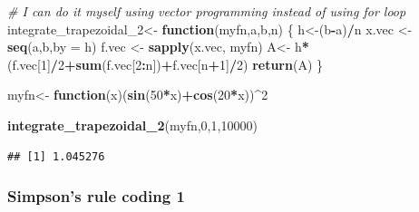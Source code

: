 \documentclass[
]{article}
\newenvironment{Shaded}{\begin{snugshade}}{\end{snugshade}}
\newcommand{\AttributeTok}[1]{\textcolor[rgb]{0.13,0.29,0.53}{#1}}
\newcommand{\CommentTok}[1]{\textcolor[rgb]{0.56,0.35,0.01}{\textit{#1}}}
\newcommand{\ControlFlowTok}[1]{\textcolor[rgb]{0.13,0.29,0.53}{\textbf{#1}}}
\newcommand{\DecValTok}[1]{\textcolor[rgb]{0.00,0.00,0.81}{#1}}
\newcommand{\FunctionTok}[1]{\textcolor[rgb]{0.13,0.29,0.53}{\textbf{#1}}}
\newcommand{\NormalTok}[1]{#1}
\newcommand{\OtherTok}[1]{\textcolor[rgb]{0.56,0.35,0.01}{#1}}
\newcommand{\SpecialCharTok}[1]{\textcolor[rgb]{0.81,0.36,0.00}{\textbf{#1}}}
\begin{document}
\begin{Shaded}
\begin{Highlighting}[]
\CommentTok{\# I can do it myself using vector programming instead of using for loop}
\NormalTok{integrate\_trapezoidal\_2}\OtherTok{\textless{}{-}} \ControlFlowTok{function}\NormalTok{(myfn,a,b,n) \{}
\NormalTok{  h}\OtherTok{\textless{}{-}}\NormalTok{(b}\SpecialCharTok{{-}}\NormalTok{a)}\SpecialCharTok{/}\NormalTok{n}
\NormalTok{  x.vec }\OtherTok{\textless{}{-}} \FunctionTok{seq}\NormalTok{(a,b,}\AttributeTok{by =}\NormalTok{ h)}
\NormalTok{  f.vec }\OtherTok{\textless{}{-}} \FunctionTok{sapply}\NormalTok{(x.vec, myfn) }
\NormalTok{  A}\OtherTok{\textless{}{-}}\NormalTok{ h}\SpecialCharTok{*}\NormalTok{(f.vec[}\DecValTok{1}\NormalTok{]}\SpecialCharTok{/}\DecValTok{2}\SpecialCharTok{+}\FunctionTok{sum}\NormalTok{(f.vec[}\DecValTok{2}\SpecialCharTok{:}\NormalTok{n])}\SpecialCharTok{+}\NormalTok{f.vec[n}\SpecialCharTok{+}\DecValTok{1}\NormalTok{]}\SpecialCharTok{/}\DecValTok{2}\NormalTok{)}
  \FunctionTok{return}\NormalTok{(A)}
\NormalTok{\}}

\NormalTok{myfn}\OtherTok{\textless{}{-}} \ControlFlowTok{function}\NormalTok{(x)(}\FunctionTok{sin}\NormalTok{(}\DecValTok{50}\SpecialCharTok{*}\NormalTok{x)}\SpecialCharTok{+}\FunctionTok{cos}\NormalTok{(}\DecValTok{20}\SpecialCharTok{*}\NormalTok{x))}\SpecialCharTok{\^{}}\DecValTok{2}

\FunctionTok{integrate\_trapezoidal\_2}\NormalTok{(myfn,}\DecValTok{0}\NormalTok{,}\DecValTok{1}\NormalTok{,}\DecValTok{10000}\NormalTok{)}
\end{Highlighting}
\end{Shaded}

\begin{verbatim}
## [1] 1.045276
\end{verbatim}

\hypertarget{simpsons-rule-coding-1}{%
\subsubsection{Simpson's rule coding 1}\label{simpsons-rule-coding-1}}
\end{document}

